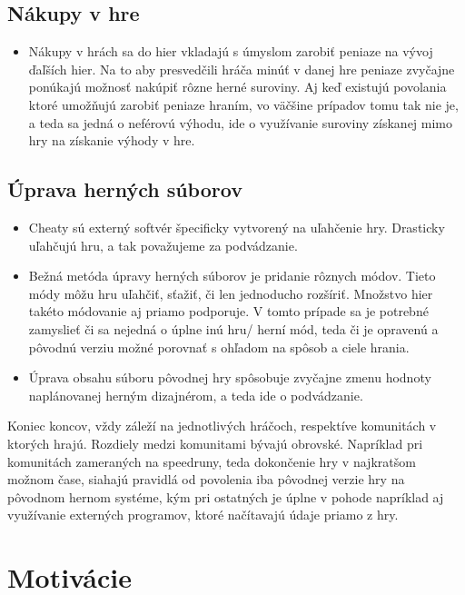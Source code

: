 \documentclass[10pt, oneside, slovak,a4paper]{article}
\begin{document}
\subsection{Nákupy v hre}
\begin{itemize}
\item Nákupy v hrách sa do hier vkladajú s úmyslom zarobiť peniaze na vývoj ďaľších hier. Na to aby presvedčili hráča minúť v danej hre peniaze zvyčajne ponúkajú možnosť nakúpiť rôzne herné suroviny. Aj keď existujú povolania ktoré umožňujú zarobiť peniaze hraním, vo väčšine prípadov tomu tak nie je, a teda sa jedná o neférovú výhodu, ide o využívanie suroviny získanej mimo hry na získanie výhody v hre.

\end{itemize}

\subsection{Úprava herných súborov}
\begin{itemize}
\item Cheaty sú externý softvér špecificky vytvorený na uľahčenie hry. Drasticky uľahčujú hru, a tak považujeme za podvádzanie.
\item Bežná metóda úpravy herných súborov je pridanie rôznych módov. Tieto módy môžu hru uľahčiť, sťažiť, či len jednoducho rozšíriť. Množstvo hier takéto módovanie aj priamo podporuje. V tomto prípade sa je potrebné zamyslieť či sa nejedná o úplne inú hru/ herní mód, teda či je opravenú a pôvodnú verziu možné porovnať s ohľadom na spôsob a ciele hrania.
\item Úprava obsahu súboru pôvodnej hry spôsobuje zvyčajne zmenu hodnoty naplánovanej herným dizajnérom, a teda ide o podvádzanie.
\end{itemize}

Koniec koncov, vždy záleží na jednotlivých hráčoch, respektíve komunitách v ktorých hrajú. Rozdiely medzi komunitami bývajú obrovské. Napríklad pri komunitách zameraných na speedruny, teda dokončenie hry v najkratšom možnom čase, siahajú pravidlá od povolenia iba pôvodnej verzie hry na pôvodnom hernom systéme, kým pri ostatných je úplne v pohode napríklad aj využívanie externých programov, ktoré načítavajú údaje priamo z hry.

\section{Motivácie}%
\end{document}
